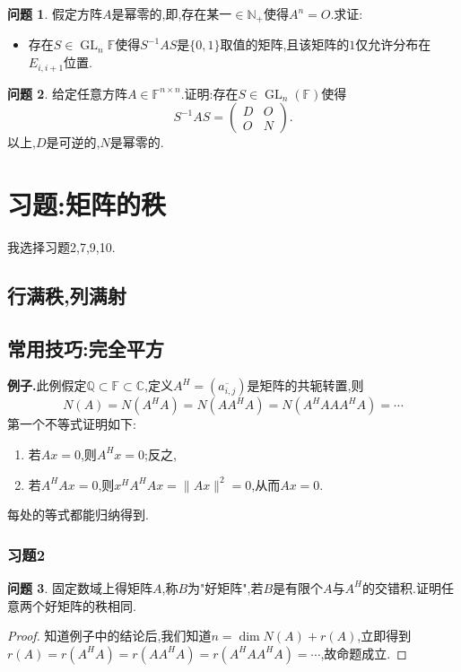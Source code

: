 \documentclass[11pt]{ctexart}
\theoremstyle{definition}
\newtheorem{qqq}{问题}[section]
\numberwithin{equation}{section}
\begin{document}
\begin{qqq}
    假定方阵$A$是幂零的,即,存在某一$\in \mathbb{N}_+$使得$A^n=O$.求证:
    \begin{itemize}
        \item 存在$S\in \operatorname{GL}_n\mathbb{F}$使得$S^{-1}AS$是$\{0,1\}$取值的矩阵,且该矩阵的$1$仅允许分布在$E_{i,i+1}$位置.
    \end{itemize}
\end{qqq}

\begin{qqq}
    给定任意方阵$A\in \mathbb{F}^{n\times n}$.证明:存在$S\in \operatorname{GL}_n(\mathbb{F})$使得$$S^{-1}AS=\begin{pmatrix}
        D&O\\O&N
    \end{pmatrix}.$$以上,$D$是可逆的,$N$是幂零的.
\end{qqq}

\newpage
\section{习题:矩阵的秩}
\begin{center}
    \large{我选择习题2,7,9,10.}
\end{center}
\subsection{行满秩,列满射}
\subsection{常用技巧:完全平方}
\textbf{例子.}此例假定$\mathbb{Q}\subset \mathbb{F} \subset \mathbb{C}$,定义$A^H=(\overline{a_{i,j}} )$是矩阵的共轭转置,则
\begin{equation}
    N(A)=N(A^HA)=N(AA^HA)=N(A^HAAA^HA)=\cdots
\end{equation}
第一个不等式证明如下:
\begin{enumerate}
    \item 若$Ax=0$,则$A^Hx=0$;反之,
    \item 若$A^HAx=0$,则$x^HA^HAx=\|Ax\|^2=0$,从而$Ax=0.$
\end{enumerate}
每处的等式都能归纳得到.
\subsubsection{习题2}
\begin{qqq}
    固定数域上得矩阵$A$,称$B$为"好矩阵",若$B$是有限个$A$与$A^H$的交错积.证明任意两个好矩阵的秩相同.
\end{qqq}
\begin{proof}
    知道例子中的结论后,我们知道$n=\dim N(A)+r(A)$,立即得到$r(A)=r(A^HA)=r(AA^HA)=r(A^HAA^HA)=\cdots $,故命题成立.
\end{proof}
\end{document}
